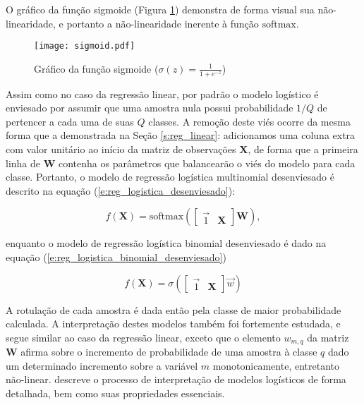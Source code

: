     O gráfico da função sigmoide (Figura \ref{f:sigmoid}) demonstra de forma visual sua não-linearidade, e portanto a não-linearidade inerente à função $\text{softmax}$.

    \begin{figure}
      \begin{center}
        \texttt{[image: sigmoid.pdf]}
      \end{center}
      \caption{Gráfico da função sigmoide ($\sigma(z) = \frac{1}{1+e^{-z}}$)}
      \label{f:sigmoid}
    \end{figure}

    Assim como no caso da regressão linear, por padrão o modelo logístico é enviesado por assumir que uma amostra nula possui probabilidade $1/Q$ de pertencer a cada uma de suas $Q$ classes. A remoção deste viés ocorre da mesma forma que a demonstrada na Seção \ref{s:reg_linear}: adicionamos uma coluna extra com valor unitário ao início da matriz de observações $\boldsymbol{X}$, de forma que a primeira linha de $\boldsymbol{W}$ contenha os parâmetros que balancearão o viés do modelo para cada classe. Portanto, o modelo de regressão logística multinomial desenviesado é descrito na equação (\ref{e:reg_logistica_desenviesado}):

    \begin{equation} \label{e:reg_logistica_desenviesado}
      f(\boldsymbol{X}) =
      \text{softmax}\left(
        \begin{bmatrix}
          \vec{1} & \boldsymbol{X}
        \end{bmatrix} \boldsymbol{W}
        \right)
      ,
    \end{equation}

    \noindent enquanto o modelo de regressão logística binomial desenviesado é dado na equação (\ref{e:reg_logistica_binomial_desenviesado})

    \begin{equation} \label{e:reg_logistica_binomial_desenviesado}
      f(\boldsymbol{X}) =
      \sigma\left(
        \begin{bmatrix}
          \vec{1} & \boldsymbol{X}
        \end{bmatrix} \vec{w}
        \right)
    \end{equation}

    A rotulação de cada amostra é dada então pela classe de maior probabilidade calculada. A interpretação destes modelos também foi fortemente estudada, e segue similar ao caso da regressão linear, exceto que o elemento $w_{m,q}$ da matriz $\boldsymbol{W}$ afirma sobre o incremento de probabilidade de uma amostra à classe $q$ dado um determinado incremento sobre a variável $m$ monotonicamente, entretanto não-linear.  descreve o processo de interpretação de modelos logísticos de forma detalhada, bem como suas propriedades essenciais.

